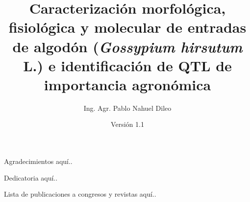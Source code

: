 \documentclass[12pt,oneside]{reedthesis}
\title{Caracterización morfológica, fisiológica y molecular de entradas de algodón (\emph{Gossypium hirsutum} L.) e identificación de QTL de importancia agronómica}
\author{Ing. Agr. Pablo Nahuel Dileo}
\date{Versión 1.1}
\begin{document}
\frontmatter 
\pagestyle{empty} %
\fancyfoot[R]{\thepage}

  \maketitle

  \begin{acknowledgements}
    Agradecimientos aquí..
    \thispagestyle{fancy} %
    \fancyhf{} %
    \fancyhead{} %
    \fancyfoot[R]{\thepage} %
  \end{acknowledgements}

  \begin{dedication}
    Dedicatoria aquí..
    \thispagestyle{fancy} %
    \fancyhf{} %
    \fancyhead{} %
    \fancyfoot[R]{\thepage} %
  \end{dedication}

  \begin{publications}
    Lista de publicaciones a congresos y revistas aquí..
    \thispagestyle{fancy} %
    \fancyhf{} %
    \fancyhead{} %
    \fancyfoot[R]{\thepage} %
  \end{publications}

  \hypersetup{linkcolor=black}
  \setcounter{secnumdepth}{2}
  \setcounter{tocdepth}{2}
  \tableofcontents
  \thispagestyle{fancy} %
    \fancyhf{} %
    \fancyhead{} %
    \fancyfoot[R]{\thepage} %
\end{document}
